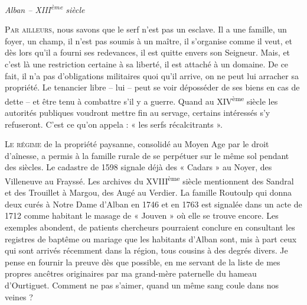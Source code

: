 
\begin{center}
  {\Large\itshape Alban – XIII\textsuperscript{ème} siècle}
\end{center}
\vspace{1.2em}

\noindent
\lettrine{P}{ar ailleurs}, nous savons que le serf n’est pas un esclave. Il a une famille, un foyer, un champ, il n’est pas soumis à un maître, il s’organise comme il veut, et dès lors qu’il a fourni ses redevances, il est quitte envers son Seigneur. Mais, et c’est là une restriction certaine à sa liberté, il est attaché à un domaine. De ce fait, il n’a pas d’obligations militaires quoi qu’il arrive, on ne peut lui arracher sa propriété. Le tenancier libre – lui – peut se voir déposséder de ses biens en cas de dette – et être tenu à combattre s’il y a guerre. Quand au XIV\textsuperscript{ème} siècle les autorités publiques voudront mettre fin au servage, certains intéressés s’y refuseront. C’est ce qu’on appela : « les serfs récalcitrants ».

\bigskip

\noindent
\lettrine{L}{e régime} de la propriété paysanne, consolidé au Moyen Age par le droit d’aînesse, a permis à la famille rurale de se perpétuer sur le même sol pendant des siècles. Le cadastre de 1598 signale déjà des « Cadars » au Noyer, des Villeneuve au Frayssé. Les archives du XVIII\textsuperscript{ème} siècle mentionnent des Sandral et des Trouillet à Margou, des Augé au Verdier. La famille Routoulp qui donna deux curés à Notre Dame d’Alban en 1746 et en 1763 est signalée dans un acte de 1712 comme habitant le masage de « Jouven » où elle se trouve encore. Les exemples abondent, de patients chercheurs pourraient conclure en consultant les registres de baptême ou mariage que les habitants d’Alban sont, mis à part ceux qui sont arrivés récemment dans la région, tous cousins à des degrés divers. Je pense en fournir la preuve dès que possible, en me servant de la liste de mes propres ancêtres originaires par ma grand-mère paternelle du hameau d’Ourtiguet. Comment ne pas s’aimer, quand un même sang coule dans nos veines ?
